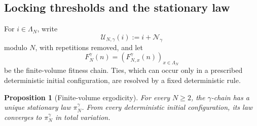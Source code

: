 \documentclass[11pt,a4paper]{amsart}
\newtheorem{proposition}[theorem]{Proposition}
\theoremstyle{remark}
\begin{document}
\subsection{Locking thresholds and the stationary law}

For $i\in\Lambda_N$, write
\[
        \mathcal U_{N,\gamma}(i)
        :=i+\mathcal N_\gamma
\]
modulo $N$, with repetitions removed, and let
\[
        F_N^\gamma(n)
        =(F_{N,x}^\gamma(n))_{x\in\Lambda_N}
\]
be the finite-volume fitness chain. Ties, which can occur only in a prescribed
deterministic initial configuration, are resolved by a fixed deterministic
rule.

\begin{proposition}[Finite-volume ergodicity]
\label{prop:app-ergodicity}
For every $N\geq2$, the $\gamma$-chain has a unique stationary law
$\pi_N^\gamma$. From every deterministic initial configuration, its law
converges to $\pi_N^\gamma$ in total variation.
\end{proposition}
\end{document}
